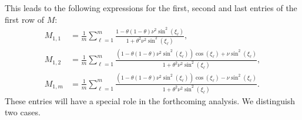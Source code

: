 \documentclass[smallextended,numbook,runningheads]{svjour3}     %
\begin{document}
This leads to the following expressions for the first, second and last entries of the first
row of $M$:
\begin{align*}
	M_{1,1} & = \frac{1}{m} \sum_{\ell=1}^m \frac{1-\theta(1-\theta)\nu^2\sin^2(\xi_\ell)}
		{1+\theta^2\nu^2\sin^2(\xi_\ell)}, \\
	M_{1,2} & = \frac{1}{m} \sum_{\ell=1}^{m} \frac{\left(1-\theta(1-\theta)\nu^2\sin^2(\xi_\ell)\right)
		\cos(\xi_\ell) + \nu \sin^2(\xi_\ell)}{1+\theta^2\nu^2 \sin^2(\xi_\ell)}, \\
	M_{1,m} & = \frac{1}{m} \sum_{\ell=1}^m \frac{\left(1-\theta(1-\theta)\nu^2\sin^2(\xi_\ell)\right)
		\cos(\xi_\ell) - \nu \sin^2 (\xi_\ell)}{1+\theta^2\nu^2 \sin^2 (\xi_\ell)}.
\end{align*}
These entries will have a special role in the forthcoming analysis. 
We distinguish two cases.
\end{document}
